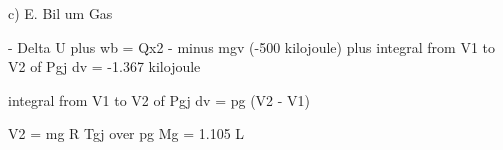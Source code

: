 c) E. Bil um Gas

- Delta U plus wb = Qx2
- minus mgv (-500 kilojoule) plus integral from V1 to V2 of Pgj dv = -1.367 kilojoule

integral from V1 to V2 of Pgj dv = pg (V2 - V1)

V2 = mg R Tgj over pg Mg = 1.105 L